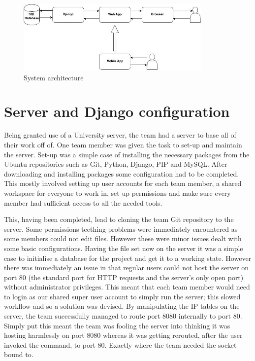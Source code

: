 \documentclass{l3proj}
\begin{document}
\begin{figure}[ht!]
\centering
\includegraphics[width=0.85\textwidth]{images/project-imp.jpg}
\caption{System architecture}
\end{figure}

\section{Server and Django configuration}
Being granted use of a University server, the team had a server to base all of their work off of. One team member was given the task to set-up and maintain the server. Set-up was a simple case of installing the necessary packages from the \gls{Ubuntu} repositories such as \gls{Git}, \gls{Python}, \gls{Django}, \gls{PIP} and \gls{MySQL}. After downloading and installing packages some configuration had to be completed. This mostly involved setting up user accounts for each team member, a shared workspace for everyone to work in, set up permissions and make sure every member had sufficient access to all the needed tools.

This, having been completed, lead to cloning the team Git repository to the server. Some permissions teething problems were immediately encountered as some members could not edit files. However these were minor issues dealt with some basic configurations.
Having the file set now on the server it was a simple case to initialise a database for the project and get it to a working state. However there was immediately an issue in that regular users could not host the server on port 80 (the standard port for HTTP requests and the server's only open port) without administrator privileges. This meant that each team member would need to login as our shared super user account to simply run the server; this slowed workflow and so a solution was devised. By manipulating the IP tables on the server, the team successfully managed to route port 8080 internally to port 80. Simply put this meant the team was fooling the server into thinking it was hosting harmlessly on port 8080 whereas it was getting rerouted, after the user invoked the command, to port 80. Exactly where the team needed the socket bound to.
\end{document}
